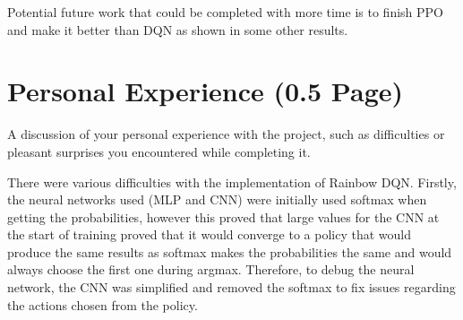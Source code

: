 \documentclass{article}
\begin{document}
Potential future work that could be completed with more time is to finish PPO and make it better than DQN as shown in some other results.



\section{Personal Experience (0.5 Page)}
A discussion of your personal experience with the project, such as difficulties or pleasant surprises you encountered while completing it.

There were various difficulties with the implementation of Rainbow DQN.
Firstly, the neural networks used (MLP and CNN) were initially used softmax when getting the probabilities, however this proved that large values for the CNN at the start of training proved that it would converge to a policy that would produce the same results as softmax makes the probabilities the same and would always choose the first one during argmax.
Therefore, to debug the neural network, the CNN was simplified and removed the softmax to fix issues regarding the actions chosen from the policy.

\newpage
 
 

\end{document}
